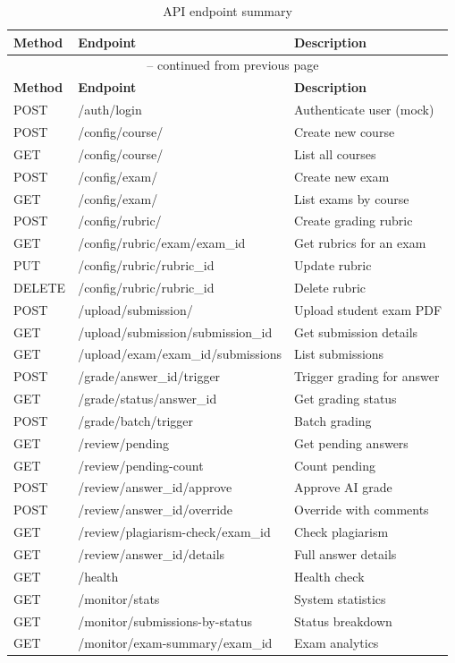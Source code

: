 \documentclass[11pt,a4paper]{article}
\begin{document}
\begin{longtable}{@{}llp{6cm}@{}}
    \caption{API endpoint summary} \label{tab:api-endpoints} \\
    \toprule
    \textbf{Method} & \textbf{Endpoint} & \textbf{Description} \\
    \midrule
    \endfirsthead
    \multicolumn{3}{c}{\tablename\ \thetable{} -- continued from previous page} \\
    \toprule
    \textbf{Method} & \textbf{Endpoint} & \textbf{Description} \\
    \midrule
    \endhead
    \bottomrule
    \endfoot
    POST & /auth/login & Authenticate user (mock) \\
    POST & /config/course/ & Create new course \\
    GET & /config/course/ & List all courses \\
    POST & /config/exam/ & Create new exam \\
    GET & /config/exam/ & List exams by course \\
    POST & /config/rubric/ & Create grading rubric \\
    GET & /config/rubric/exam/{exam\_id} & Get rubrics for an exam \\
    PUT & /config/rubric/{rubric\_id} & Update rubric \\
    DELETE & /config/rubric/{rubric\_id} & Delete rubric \\
    POST & /upload/submission/ & Upload student exam PDF \\
    GET & /upload/submission/{submission\_id} & Get submission details \\
    GET & /upload/exam/{exam\_id}/submissions & List submissions \\
    POST & /grade/{answer\_id}/trigger & Trigger grading for answer \\
    GET & /grade/status/{answer\_id} & Get grading status \\
    POST & /grade/batch/trigger & Batch grading \\
    GET & /review/pending & Get pending answers \\
    GET & /review/pending-count & Count pending \\
    POST & /review/{answer\_id}/approve & Approve AI grade \\
    POST & /review/{answer\_id}/override & Override with comments \\
    GET & /review/plagiarism-check/{exam\_id} & Check plagiarism \\
    GET & /review/{answer\_id}/details & Full answer details \\
    GET & /health & Health check \\
    GET & /monitor/stats & System statistics \\
    GET & /monitor/submissions-by-status & Status breakdown \\
    GET & /monitor/exam-summary/{exam\_id} & Exam analytics \\
\end{longtable}
\end{document}
